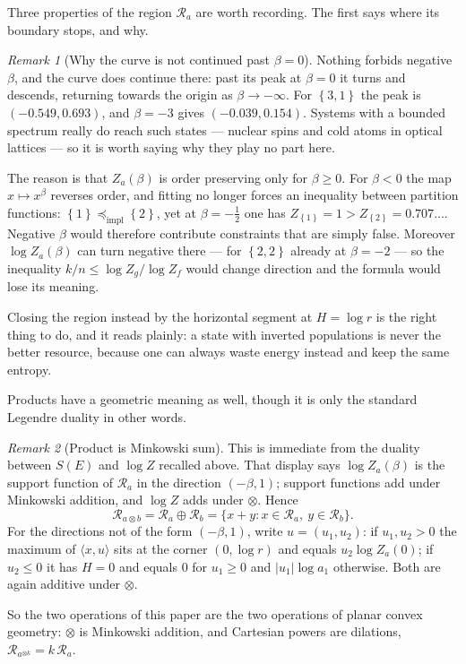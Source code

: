 \documentclass[11pt]{article}
\theoremstyle{definition}
\theoremstyle{remark}
\newtheorem{remark}{Remark}
\newcommand{\sig}[1]{\left\{#1\right\}}
\newcommand{\impl}{\preccurlyeq_{\mathrm{impl}}}
\begin{document}
Three properties of the region \(\mathcal R_a\) are worth recording.  The
first says where its boundary stops, and why.

\begin{remark}[Why the curve is not continued past \(\beta=0\)]
\label{rem:negative-temperature}
Nothing forbids negative \(\beta\), and the curve does continue there: past
its peak at \(\beta=0\) it turns and descends, returning towards the origin as
\(\beta\to-\infty\).  For \(\sig{3,1}\) the peak is \((-0.549,0.693)\), and
\(\beta=-3\) gives \((-0.039,0.154)\).  Systems with a bounded spectrum really
do reach such states --- nuclear spins and cold atoms in optical lattices ---
so it is worth saying why they play no part here.

The reason is that \(Z_a(\beta)\) is order preserving only for
\(\beta\geq0\).  For \(\beta<0\) the map \(x\mapsto x^\beta\) reverses order,
and fitting no longer forces an inequality between partition functions:
\(\sig{1}\impl\sig{2}\), yet at \(\beta=-\tfrac12\) one has
\(Z_{\sig{1}}=1>Z_{\sig{2}}=0.707\ldots\).  Negative \(\beta\) would therefore
contribute constraints that are simply false.  Moreover \(\log Z_a(\beta)\)
can turn negative there --- for \(\sig{2,2}\) already at \(\beta=-2\) --- so
the inequality \(k/n\leq\log Z_g/\log Z_f\) would change direction and the
formula would lose its meaning.

Closing the region instead by the horizontal segment at \(H=\log r\) is the
right thing to do, and it reads plainly: a state with inverted populations is
never the better resource, because one can always waste energy instead and
keep the same entropy.
\end{remark}

Products have a geometric meaning as well, though it is only the standard
Legendre duality in other words.

\begin{remark}[Product is Minkowski sum]
\label{rem:minkowski}
This is immediate from the duality between \(S(E)\) and \(\log Z\) recalled
above.  That display says \(\log Z_a(\beta)\) is the support function of
\(\mathcal R_a\) in the direction \((-\beta,1)\); support functions add under
Minkowski addition, and \(\log Z\) adds under \(\otimes\).  Hence
\[
  \mathcal R_{a\otimes b}
  =\mathcal R_a\oplus\mathcal R_b
  =\{x+y:x\in\mathcal R_a,\ y\in\mathcal R_b\}.
\]
For the directions not of the form \((-\beta,1)\), write \(u=(u_1,u_2)\):
if \(u_1,u_2>0\) the maximum of \(\langle x,u\rangle\) sits at the corner
\((0,\log r)\) and equals \(u_2\log Z_a(0)\); if \(u_2\leq0\) it has \(H=0\)
and equals \(0\) for \(u_1\geq0\) and \(|u_1|\log a_1\) otherwise.  Both are
again additive under \(\otimes\).

So the two operations of this paper are the two operations of planar convex
geometry: \(\otimes\) is Minkowski addition, and Cartesian powers are
dilations, \(\mathcal R_{a^{\otimes k}}=k\,\mathcal R_a\).
\end{remark}
\end{document}
